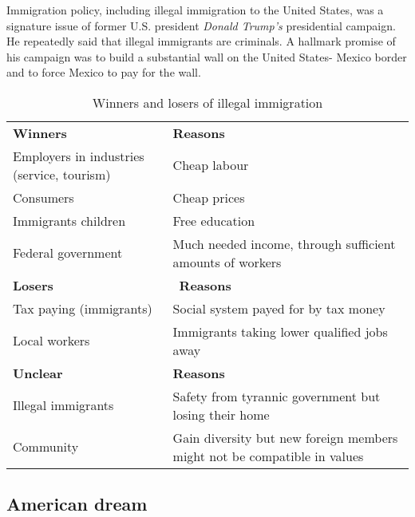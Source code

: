 \documentclass[10pt]{article}
\begin{document}
Immigration policy, including illegal immigration to the United States, was a signature issue of former
U.S. president \emph{Donald Trump's} presidential campaign. He repeatedly said that illegal immigrants are
criminals. A hallmark promise of his campaign was to build a substantial wall on the United States-
Mexico border and to force Mexico to pay for the wall.

\begin{table}[htbp]
	\centering
	\begin{tabularx}{\textwidth}{X|X}
		\hline
		{\sffamily\bfseries Winners} & {\sffamily\bfseries Reasons}\\
		Employers in industries (service, tourism) & Cheap labour \\
		Consumers & Cheap prices \\
		Immigrants children & Free education \\
		Federal government & Much needed income, through sufficient amounts of workers \\ \hline
		{\sffamily\bfseries Losers} & \ {\sffamily\bfseries Reasons}\\
		Tax paying (immigrants) & Social system payed for by tax money \\
		Local workers & Immigrants taking lower qualified jobs away \\ \hline
		{\sffamily\bfseries Unclear} & {\sffamily\bfseries Reasons}\\
		Illegal immigrants & Safety from tyrannic government but losing their home\\
		Community & Gain diversity but new foreign members might not be compatible in values \\ \hline
	\end{tabularx}
	\caption{Winners and losers of illegal immigration}
	\label{tab:my_label}
\end{table}

\subsection{American dream}
	\label{ssec:usa@dream}
\end{document}
